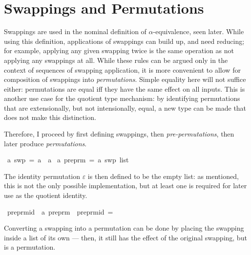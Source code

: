 \section{Swappings and Permutations}
Swappings are used in the nominal definition of \(\alpha\)-equivalence, seen later.
While using this definition, applications of swappings can build up, and need reducing; for example, applying any given swapping twice is the same operation as not applying any swappings at all.
While these rules can be argued only in the context of sequences of swapping application, it is more convenient to allow for composition of swappings into \emph{permutations}.
Simple equality here will not suffice either: permutations are equal iff they have the same effect on all inputs.
This is another use case for the quotient type mechanism: by identifying permutations that are extensionally, but not intensionally, equal, a new type can be made that does not make this distinction.

Therefore, I proceed by first defining swappings, then \emph{pre-permutations}, then later produce \emph{permutations}.

\begin{implementation}
\isamarkupfalse%
\ {\isacharprime}a\ swp\ =\ {\isachardoublequoteopen}{\isacharprime}a\ {\isasymtimes}\ {\isacharprime}a{\isachardoublequoteclose}\isanewline
{}\isamarkupfalse%
\ {\isacharprime}a\ preprm\ =\ {\isachardoublequoteopen}{\isacharprime}a\ swp\ list{\isachardoublequoteclose}\isanewline
\end{implementation}

The identity permutation \(\varepsilon\) is then defined to be the empty list: as mentioned, this is not the only possible implementation, but at least one is required for later use as the quotient identity.

\begin{implementation}
\isamarkupfalse%
\ preprm{\isacharunderscore}id\ {\isacharcolon}{\isacharcolon}\ {\isachardoublequoteopen}{\isacharprime}a\ preprm{\isachardoublequoteclose}\ \ {\isachardoublequoteopen}preprm{\isacharunderscore}id\ =\ {\isacharbrackleft}{\isacharbrackright}{\isachardoublequoteclose}\isanewline
\end{implementation}

Converting a swapping into a permutation can be done by placing the swapping inside a list of its own --- then, it still has the effect of the original swapping, but is a permutation.

